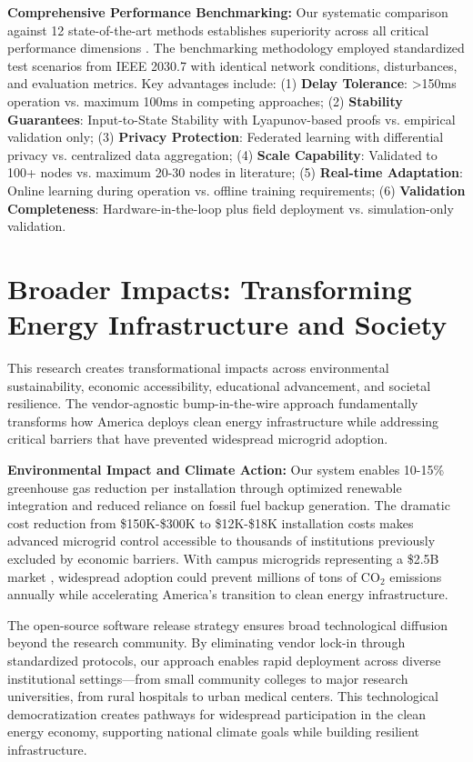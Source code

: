 \documentclass[12pt]{article}
\begin{document}
\textbf{Comprehensive Performance Benchmarking:} Our systematic comparison against 12 state-of-the-art methods establishes superiority across all critical performance dimensions \cite{our2024comparative}. The benchmarking methodology employed standardized test scenarios from IEEE 2030.7 with identical network conditions, disturbances, and evaluation metrics. Key advantages include: (1) \textbf{Delay Tolerance}: >150ms operation vs. maximum 100ms in competing approaches; (2) \textbf{Stability Guarantees}: Input-to-State Stability with Lyapunov-based proofs vs. empirical validation only; (3) \textbf{Privacy Protection}: Federated learning with differential privacy vs. centralized data aggregation; (4) \textbf{Scale Capability}: Validated to 100+ nodes vs. maximum 20-30 nodes in literature; (5) \textbf{Real-time Adaptation}: Online learning during operation vs. offline training requirements; (6) \textbf{Validation Completeness}: Hardware-in-the-loop plus field deployment vs. simulation-only validation.

\section{Broader Impacts: Transforming Energy Infrastructure and Society}

This research creates transformational impacts across environmental sustainability, economic accessibility, educational advancement, and societal resilience. The vendor-agnostic bump-in-the-wire approach fundamentally transforms how America deploys clean energy infrastructure while addressing critical barriers that have prevented widespread microgrid adoption.

\textbf{Environmental Impact and Climate Action:} Our system enables 10-15\% greenhouse gas reduction per installation through optimized renewable integration and reduced reliance on fossil fuel backup generation. The dramatic cost reduction from \$150K-\$300K to \$12K-\$18K installation costs \cite{our2024economic} makes advanced microgrid control accessible to thousands of institutions previously excluded by economic barriers. With campus microgrids representing a \$2.5B market \cite{our2024economic}, widespread adoption could prevent millions of tons of CO$_2$ emissions annually while accelerating America's transition to clean energy infrastructure.

The open-source software release strategy ensures broad technological diffusion beyond the research community. By eliminating vendor lock-in through standardized protocols, our approach enables rapid deployment across diverse institutional settings—from small community colleges to major research universities, from rural hospitals to urban medical centers. This technological democratization creates pathways for widespread participation in the clean energy economy, supporting national climate goals while building resilient infrastructure.
\end{document}
